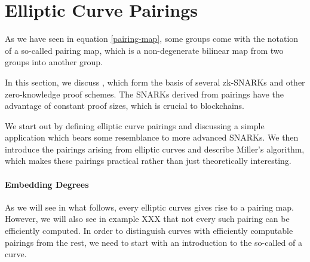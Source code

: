 
\section{Elliptic Curve Pairings}
\label{sec:elliptic_curve_pairings}
 As we have seen in equation \ref{pairing-map}, some groups come with the notation of a so-called pairing map, which is a non-degenerate bilinear map from two groups into another group.

In this section, we discuss , which form the basis of several zk-SNARKs and other zero-knowledge proof schemes. The SNARKs derived from pairings have the advantage of constant proof sizes, which is crucial to blockchains. 

We start out by defining elliptic curve pairings and discussing a simple application which bears some resemblance to more advanced SNARKs. We then introduce the pairings arising from elliptic curves and describe Miller's algorithm, which makes these pairings practical rather than just theoretically interesting.


\paragraph{Embedding Degrees}As we will see in what follows, every elliptic curves gives rise to a pairing map. However, we will also see in example XXX that not every such pairing can be efficiently computed. In order to distinguish curves with efficiently computable pairings from the rest, we need to start with an introduction to the so-called  of a curve. 

